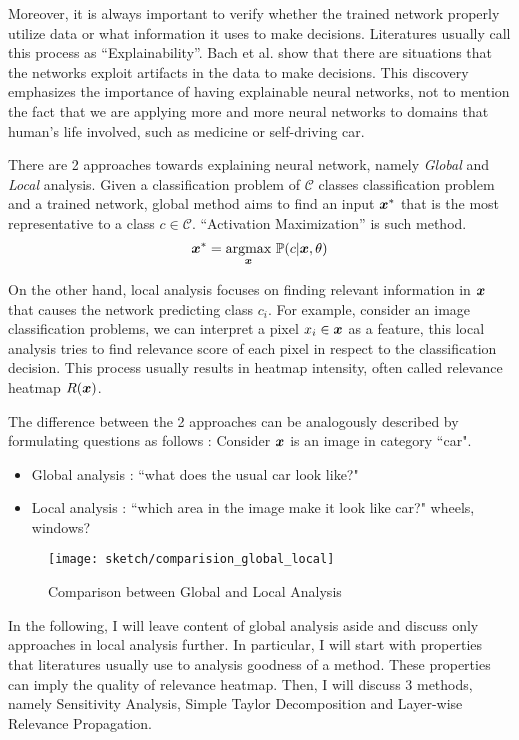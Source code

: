 Moreover, it is always important to verify whether the trained network properly utilize data or what information it uses to make decisions. Literatures usually call this process as ``Explainability''.  Bach et al.\cite{BachAnalyzingClassifiersFisher2015} show that there are situations that the networks exploit artifacts in the data to make decisions. This discovery emphasizes the importance of having explainable neural networks, not to mention the fact that we are applying more and more neural networks to domains that human's life involved, such as medicine or self-driving car.

There are 2 approaches towards explaining neural network, namely \textit{Global} and \textit{Local} analysis. Given a  classification problem of $\mathcal{C}$ classes classification problem and a trained network, global method aims to find an input $\patvector{x}^*$ that is the most representative to a class $c \in \mathcal{C}$. ``Activation Maximization\cite{ErhanUnderstandingRepresentationsLearned2010}'' is such method.
$$
\patvector{x}^*  = \patarg{max}{\patvector{x}}  \mathbb{P}( c |\patvector{x},\theta)
$$

On the other hand, local analysis focuses on finding relevant information in $\patvector{x}$ that causes the network predicting class $c_i$.  For example, consider an image classification problems, we can interpret a pixel $x_i \in \patvector{x}$ as a feature, this local analysis tries to find relevance score of each pixel in respect to the classification decision. This process usually results in heatmap intensity, often called relevance heatmap $R(\patvector{x})$.

The difference  between the 2 approaches can be analogously described by formulating questions as follows : Consider $\patvector{x}$ is an image in category ``car".
\begin{itemize}
	\item Global analysis : ``what does the usual car look like?"
    \item Local analysis : ``which area in the image make it look like car?" wheels, windows?
\end{itemize}

 \begin{figure}[!hbt]
\centering
\texttt{[image: sketch/comparision\_global\_local]}
\caption{Comparison between Global and Local Analysis}
\label{fig:comparision_between_global_and_local_analysis}
\end{figure}

In the following, I will leave content of global analysis aside and discuss  only approaches in local analysis further.  In particular, I will start with properties that literatures usually use to analysis goodness of a method. These properties can imply the quality of relevance heatmap. Then, I will discuss  3 methods, namely Sensitivity Analysis,  Simple Taylor Decomposition and Layer-wise Relevance Propagation.

